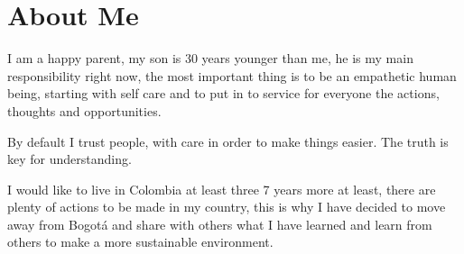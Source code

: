 \section{About Me}

I am a happy parent, my son is 30 years younger than me, he is
my main responsibility right now, the most important thing is
to be an empathetic human being, starting with self care and
to put in to service for everyone the actions, thoughts and
opportunities.

By default I trust people, with care in order to make things
easier.  The truth is key for understanding.

I would like to live in Colombia at least three 7 years more
at least, there are plenty of actions to be made in my 
country, this is why I have decided to move away from Bogotá
and share with others what I have learned and learn from others
to make a more sustainable environment.
